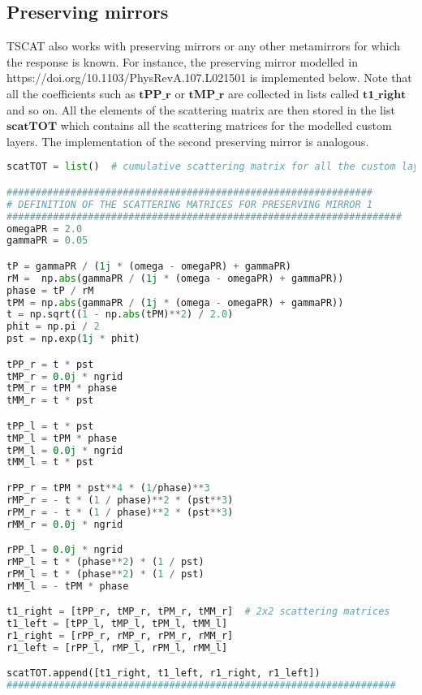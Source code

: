 \documentclass[showpacs,aps,prl,onecolumn,superscriptaddress]{revtex4-1}
\begin{document}
\subsection{Preserving mirrors}
TSCAT also works with preserving mirrors or any other metamirrors for which the response is known. For instance, the preserving mirror modelled in https://doi.org/10.1103/PhysRevA.107.L021501 is implemented below. Note that all the coefficients such as $\mathbf{tPP\_r}$ or $\mathbf{tMP\_r}$ are collected in lists called $\mathbf{t1\_right}$ and so on. All the elements of the scattering matrix are then stored in the list $\mathbf{scatTOT}$ which contains all the scattering matrices for the modelled custom layers. The implementation of the second preserving mirror is analogous.
\begin{lstlisting}[language=Python, caption=Implementation of the response of the first preserving mirror.]
scatTOT = list()  # cumulative scattering matrix for all the custom layers

###############################################################
# DEFINITION OF THE SCATTERING MATRICES FOR PRESERVING MIRROR 1 
####################################################################
omegaPR = 2.0
gammaPR = 0.05

tP = gammaPR / (1j * (omega - omegaPR) + gammaPR)
rM =  np.abs(gammaPR / (1j * (omega - omegaPR) + gammaPR))
phase = tP / rM
tPM = np.abs(gammaPR / (1j * (omega - omegaPR) + gammaPR))
t = np.sqrt((1 - np.abs(tPM)**2) / 2.0)
phit = np.pi / 2
pst = np.exp(1j * phit)

tPP_r = t * pst 
tMP_r = 0.0j * ngrid
tPM_r = tPM * phase 
tMM_r = t * pst

tPP_l = t * pst 
tMP_l = tPM * phase 
tPM_l = 0.0j * ngrid
tMM_l = t * pst 

rPP_r = tPM * pst**4 * (1/phase)**3 
rMP_r = - t * (1 / phase)**2 * (pst**3) 
rPM_r = - t * (1 / phase)**2 * (pst**3) 
rMM_r = 0.0j * ngrid

rPP_l = 0.0j * ngrid
rMP_l = t * (phase**2) * (1 / pst)
rPM_l = t * (phase**2) * (1 / pst)
rMM_l = - tPM * phase

t1_right = [tPP_r, tMP_r, tPM_r, tMM_r]  # 2x2 scattering matrices
t1_left = [tPP_l, tMP_l, tPM_l, tMM_l]
r1_right = [rPP_r, rMP_r, rPM_r, rMM_r]
r1_left = [rPP_l, rMP_l, rPM_l, rMM_l]

scatTOT.append([t1_right, t1_left, r1_right, r1_left])
###################################################################
\end{lstlisting}
\end{document}
